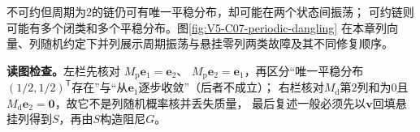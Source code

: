 \documentclass[UTF8,a4paper,11pt,openany]{ctexbook}
\begin{document}
\setcounter{page}{714}
\setcounter{chapter}{36}
\setcounter{section}{1}
\setcounter{figure}{2}
\pagestyle{headings}
不可约但周期为$2$的链仍可有唯一平稳分布，却可能在两个状态间振荡；
可约链则可能有多个闭类和多个平稳分布。图\ref{fig:V5-C07-periodic-dangling}
在本章列向量、列随机约定下并列展示周期振荡与悬挂零列两类故障及其不同修复顺序。

\FloatBarrier
\noindent\textbf{读图检查。}左栏先核对
$M_{\mathrm p}\boldsymbol e_1=\boldsymbol e_2$、
$M_{\mathrm p}\boldsymbol e_2=\boldsymbol e_1$，再区分“唯一平稳分布
$(1/2,1/2)^{\mathsf T}$存在”与“从$\boldsymbol e_1$逐步收敛”（后者不成立）；
右栏核对$M_{\mathrm d}$第$2$列和为$0$且
$M_{\mathrm d}\boldsymbol e_2=\boldsymbol0$，故它不是列随机概率核并丢失质量，
最后复述一般\PageRank{}必须先以$\boldsymbol v$回填悬挂列得到$S$，再由$S$构造阻尼$G$。
\end{document}
